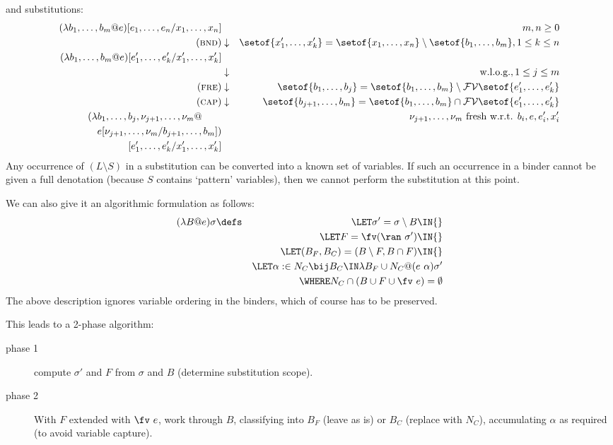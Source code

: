 and substitutions:
\begin{eqnarray*}
  (\lambda b_1,\ldots,b_m @ e)[e_1,\ldots,e_n/x_1,\ldots,x_n] && m,n \geq 0
\\  (\textsc{bnd})
    &\downarrow&
    \setof{x'_1,\ldots,x'_k}  = \setof{x_1,\ldots,x_n}\setminus\setof{b_1,\ldots,b_m}, 1 \leq k \leq n
\\ (\lambda b_1,\ldots,b_m @ e)[e'_1,\ldots,e'_k/x'_1,\ldots,x'_k] &&
\\ &\downarrow& \mbox{w.l.o.g.}, 1 \leq j \leq m
\\ (\textsc{fre})
   &\downarrow&
   \setof{b_1,\ldots,b_j} = \setof{b_1,\ldots,b_m}\setminus \mathcal{FV}\setof{e'_1,\ldots,e'_k}
\\ (\textsc{cap})
   &\downarrow&
   \setof{b_{j+1},\ldots,b_m} = \setof{b_1,\ldots,b_m}\cap \mathcal{FV}\setof{e'_1,\ldots,e'_k}
\\ (\lambda b_1,\ldots,b_j,\nu_{j+1},\ldots,\nu_m @ \qquad
   && \nu_{j+1},\ldots,\nu_m \mbox{ fresh w.r.t. } b_i, e, e'_i, x'_i
\\  e[\nu_{j+1},\ldots,\nu_m/b_{j+1},\ldots,b_m])
\\  {}[e'_1,\ldots,e'_k/x'_1,\ldots,x'_k]
\end{eqnarray*}
Any occurrence of $(L\setminus S)$ in a substitution can
be converted into a known set of variables.
If such an occurrence in a binder cannot be given a full denotation
(because $S$ contains `pattern' variables),
then we cannot perform the substitution at this point.

We can also give it an algorithmic formulation as follows:
\begin{eqnarray*}
  (\lambda B @ e) \sigma
  &\defs&
     {}\LET \sigma' = \sigma \setminus B \IN {}
\\&& {}\LET F = \fv(\ran~\sigma') \IN{}
\\&& {}\LET (B_F,B_C) = (B \setminus F, B \cap F) \IN {}
\\&& {}\LET \alpha :\in N_C \bij B_C \IN \lambda B_F \cup N_C @ (e~\alpha)\sigma'
\\&& {}\WHERE N_C \cap (B \cup F \cup \fv~e) = \emptyset
\end{eqnarray*}
The above description ignores variable ordering
in the binders, which of course has to be preserved.

This leads to a 2-phase algorithm:
\begin{description}
  \item[phase 1] compute $\sigma'$ and $F$ from $\sigma$ and $B$
   (determine substitution scope).
  \item[phase 2] With $F$ extended with $\fv~e$, work through $B$,
    classifying into $B_F$ (leave as is) or $B_C$ (replace with $N_C$),
   accumulating $\alpha$ as required
   (to avoid variable capture).
\end{description}